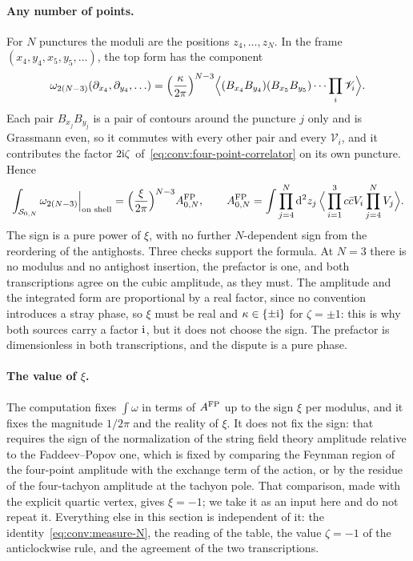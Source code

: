 \paragraph{Any number of points.}
For $N$ punctures the moduli are the positions $z_4, \ldots, z_N$.
In the frame $(x_4, y_4, x_5, y_5, \ldots)$, the top form has the component
\begin{equation}
  \omega_{2(N-3)}(\partial_{x_4}, \partial_{y_4}, \ldots)
    = \Big( \frac{\kappa}{2\pi} \Big)^{N-3}
      \Big\langle (B_{x_4} B_{y_4}) (B_{x_5} B_{y_5}) \cdots \prod_i \mathscr V_i \Big\rangle.
\end{equation}
Each pair $B_{x_j} B_{y_j}$ is a pair of contours around the puncture $j$ only and is Grassmann even, so it commutes with every other pair and every $\mathscr V_i$, and it contributes the factor $2 \mathrm{i} \zeta$ of~\eqref{eq:conv:four-point-correlator} on its own puncture.
Hence
\begin{equation}
  \label{eq:conv:measure-N}
  \int_{{\mathcal{S}}_{0,N}} \omega_{2(N-3)} \Big\vert_{\text{on shell}}
    = \Big( \frac{\xi}{2\pi} \Big)^{N-3} A^{\rm FP}_{0,N},
  \qquad
  A^{\rm FP}_{0,N}
    = \int \prod_{j=4}^N \mathrm{d}^2 z_j \,
      \Big\langle \prod_{i=1}^3 c \bar c V_i \prod_{j=4}^N V_j \Big\rangle.
\end{equation}
The sign is a pure power of $\xi$, with no further $N$-dependent sign from the reordering of the antighosts.
Three checks support the formula.
At $N = 3$ there is no modulus and no antighost insertion, the prefactor is one, and both transcriptions agree on the cubic amplitude, as they must.
The amplitude and the integrated form are proportional by a real factor, since no convention introduces a stray phase, so $\xi$ must be real and $\kappa \in \{ \pm \mathrm{i} \}$ for $\zeta = \pm 1$: this is why both sources carry a factor $\mathrm{i}$, but it does not choose the sign.
The prefactor is dimensionless in both transcriptions, and the dispute is a pure phase.

\paragraph{The value of $\xi$.}
The computation fixes $\int \omega$ in terms of $A^{\rm FP}$ up to the sign $\xi$ per modulus, and it fixes the magnitude $1 / 2\pi$ and the reality of $\xi$.
It does not fix the sign: that requires the sign of the normalization of the string field theory amplitude relative to the Faddeev--Popov one, which is fixed by comparing the Feynman region of the four-point amplitude with the exchange term of the action, or by the residue of the four-tachyon amplitude at the tachyon pole.
That comparison, made with the explicit quartic vertex, gives $\xi = -1$; we take it as an input here and do not repeat it.
Everything else in this section is independent of it: the identity~\eqref{eq:conv:measure-N}, the reading of the table, the value $\zeta = -1$ of the anticlockwise rule, and the agreement of the two transcriptions.

